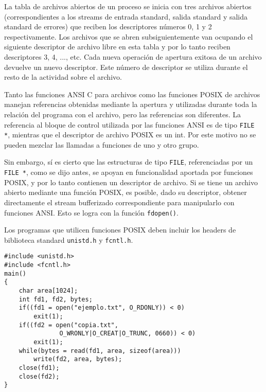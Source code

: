 La tabla de archivos abiertos de un proceso se inicia con tres archivos
abiertos (correspondientes a los streams de entrada standard, salida standard y
salida standard de errores) que reciben los descriptores números 0, 1 y 2
respectivamente. Los archivos que se abren subsiguientemente van ocupando el
siguiente descriptor de archivo libre en esta tabla y por lo tanto reciben
descriptores 3, 4, ..., etc. Cada nueva operación de apertura exitosa de un
archivo devuelve un nuevo descriptor. Este número de descriptor se utiliza
durante el resto de la actividad sobre el archivo.

Tanto las funciones ANSI C para archivos como las funciones POSIX de archivos
manejan referencias obtenidas mediante la apertura y utilizadas durante toda la
relación del programa con el archivo, pero las referencias son diferentes. La
referencia al bloque de control utilizada por las funciones ANSI es de tipo
\lstinline{FILE *}, mientras que el descriptor de archivo POSIX es un int. Por este motivo
no se pueden mezclar las llamadas a funciones de uno y otro grupo.

Sin embargo, sí es cierto que las estructuras de tipo \lstinline{FILE}, referenciadas por
un \lstinline{FILE *}, como se dijo antes, se apoyan en funcionalidad aportada por
funciones POSIX, y por lo tanto contienen un descriptor de archivo. Si se tiene
un archivo abierto mediante una función POSIX, es posible, dado su descriptor,
obtener directamente el stream bufferizado correspondiente para manipularlo con
funciones ANSI. Esto se logra con la función \lstinline{fdopen()}.

Los programas que utilicen funciones POSIX deben incluir los headers de
biblioteca standard \lstinline{unistd.h} y \lstinline{fcntl.h}.

\begin{ejemplo}
\begin{lstlisting}
#include <unistd.h>
#include <fcntl.h>
main()
{
    char area[1024];
    int fd1, fd2, bytes;
    if((fd1 = open("ejemplo.txt", O_RDONLY)) < 0)
        exit(1);
    if((fd2 = open("copia.txt",
               O_WRONLY|O_CREAT|O_TRUNC, 0660)) < 0)
        exit(1);
    while(bytes = read(fd1, area, sizeof(area)))
        write(fd2, area, bytes);
    close(fd1);
    close(fd2);
}
\end{lstlisting}
\end{ejemplo}

